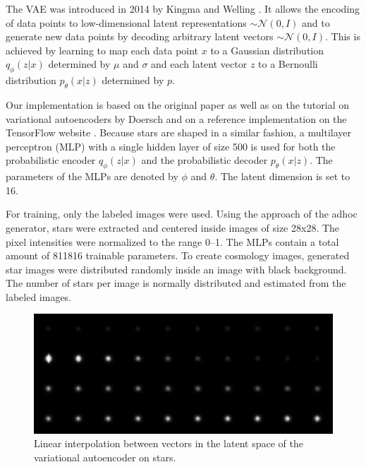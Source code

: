 \documentclass[10pt,conference,compsocconf]{IEEEtran}
\begin{document}
The VAE was introduced in 2014 by Kingma and Welling \cite{DBLP:journals/corr/KingmaW13}. It allows the encoding of data points to low-dimensional latent representations  $\sim\mathcal{N}(0, I)$ and to generate new data points by decoding arbitrary latent vectors $\sim\mathcal{N}(0, I)$. This is achieved by learning to map each data point $x$ to a Gaussian distribution $q_{\phi}(z|x)$ determined by $\mu$ and $\sigma$ and each latent vector $z$ to a Bernoulli distribution $p_{\theta}(x|z)$ determined by $p$.
 
Our implementation is based on the original paper as well as on the tutorial on variational autoencoders by Doersch \cite{doersch2016tutorial} and on a reference implementation on the TensorFlow website \cite{cvaetf}. Because stars are shaped in a similar fashion, a multilayer perceptron (MLP) with a single hidden layer of size \SI{500}{} is used for both the probabilistic encoder $q_{\phi}(z|x)$ and the probabilistic decoder $p_{\theta}(x|z)$. The parameters of the MLPs are denoted by $\phi$ and $\theta$. The latent dimension is set to \SI{16}{}. 

For training, only the labeled images were used. Using the approach of the adhoc generator, stars were extracted and centered inside images of size \SI{28}{}x\SI{28}{}. The pixel intensities were normalized to the range \SIrange{0}{1}{}. The MLPs contain a total amount of \SI{811816}{} trainable parameters. To create cosmology images, generated star images were distributed randomly inside an image with black background. The number of stars per image is normally distributed and estimated from the labeled images. 


\begin{figure}
    \centering
    \includegraphics[width=\columnwidth]{assets/vae_interpolation_resized.png}
    \caption{Linear interpolation between vectors in the latent space of the variational autoencoder on stars.}
    \label{fig:vae_interpolation}
\end{figure}
\end{document}
